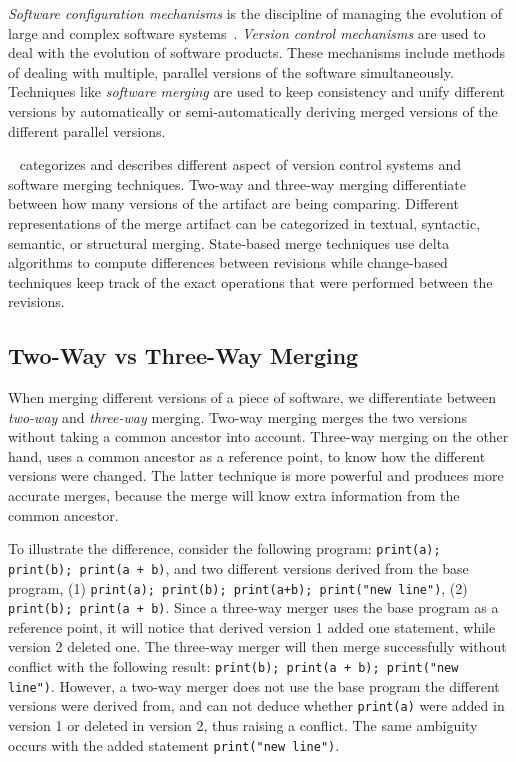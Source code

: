 \documentclass[a4paper,english]{ifimaster}
\begin{document}
\textit{Software configuration mechanisms} is the discipline of managing the evolution of large and complex software systems~\cite{cite:software_configuration_management}. \textit{Version control mechanisms} are used to deal with the evolution of software products. These mechanisms include methods of dealing with multiple, parallel versions of the software simultaneously. Techniques like \textit{software merging} are used to keep consistency and unify different versions by automatically or semi-automatically deriving merged versions of the different parallel versions.

\citeauthor{cite:tom_mens_software_merging_survey}~\cite{cite:tom_mens_software_merging_survey} categorizes and describes different aspect of version control systems and software merging techniques. Two-way and three-way merging differentiate between how many versions of the artifact are being comparing. Different representations of the merge artifact can be categorized in textual, syntactic, semantic, or structural merging. State-based merge techniques use delta algorithms to compute differences between revisions while change-based techniques keep track of the exact operations that were performed between the revisions.

\subsection{Two-Way vs Three-Way Merging}%
\label{sub:two_way_vs_three_way_merging}

When merging different versions of a piece of software, we differentiate between \textit{two-way} and \textit{three-way} merging. Two-way merging merges the two versions without taking a common ancestor into account. Three-way merging on the other hand, uses a common ancestor as a reference point, to know how the different versions were changed. The latter technique is more powerful and produces more accurate merges, because the merge will know extra information from the common ancestor.

To illustrate the difference, consider the following program: \texttt{print(a); print(b); print(a + b)}, and two different versions derived from the base program, (1) \texttt{print(a); print(b); print(a+b); print("new line")}, (2) \texttt{print(b); print(a + b)}. Since a three-way merger uses the base program as a reference point, it will notice that derived version 1 added one statement, while version 2 deleted one. The three-way merger will then merge successfully without conflict with the following result: \texttt{print(b); print(a + b); print("new line")}. However, a two-way merger does not use the base program the different versions were derived from, and can not deduce whether \texttt{print(a)} were added in version 1 or deleted in version 2, thus raising a conflict. The same ambiguity occurs with the added statement \texttt{print("new line")}.
\end{document}
